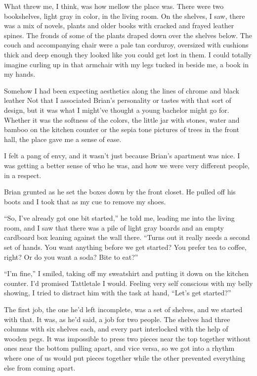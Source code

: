What threw me, I think, was how mellow the place was.  There were two bookshelves, light gray in color, in the living room.  On the shelves, I saw, there was a mix of novels, plants and older books with cracked and frayed leather spines.  The fronds of some of the plants draped down over the shelves below.  The couch and accompanying chair were a pale tan corduroy, oversized with cushions thick and deep enough they looked like you could get lost in them.  I could totally imagine curling up in that armchair with my legs tucked in beside me, a book in my hands.



Somehow I had been expecting aesthetics along the lines of chrome and black leather  Not that I associated Brian's personality or tastes with that sort of design, but it was what I might've thought a young bachelor might go for.  Whether it was the softness of the colors, the little jar with stones, water and bamboo on the kitchen counter or the sepia tone pictures of trees in the front hall, the place gave me a sense of ease.



I felt a pang of envy, and it wasn't just because Brian's apartment was nice.  I was getting a better sense of who he was, and how we were very different people, in a respect.



Brian grunted as he set the boxes down by the front closet.  He pulled off his boots and I took that as my cue to remove my shoes.



``So, I've already got one bit started,'' he told me, leading me into the living room, and I saw that there was a pile of light gray boards and an empty cardboard box leaning against the wall there.  ``Turns out it really needs a second set of hands.  You want anything before we get started?  You prefer tea to coffee, right?  Or do you want a soda?  Bite to eat?''



``I'm fine,'' I smiled, taking off my sweatshirt and putting it down on the kitchen counter.  I'd promised Tattletale I would.  Feeling very self conscious with my belly showing, I tried to distract him with the task at hand, ``Let's get started?''



The first job, the one he'd left incomplete, was a set of shelves, and we started with that.  It was, as he'd said, a job for two people.  The shelves had three columns with six shelves each, and every part interlocked with the help of wooden pegs.  It was impossible to press two pieces near the top together without ones near the bottom pulling apart, and vice versa, so we got into a rhythm where one of us would put pieces together while the other prevented everything else from coming apart.



